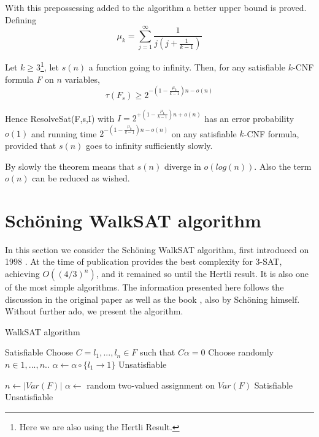 With this prepossessing added to the algorithm a better upper bound is proved. Defining
$$ \mu_k = \sum_{j=1}^\infty \frac{1}{j \left (j + \frac{1}{k-1}\right )}$$

\begin{theorem} Let $k\ge 3$\footnote{Here we are also using the Hertli Result\cite{hertli20143}.}, let $s(n)$ a function going to infinity. Then, for any satisfiable $k$-CNF formula $F$ on $n$ variables,
  $$\tau(F_s) \ge 2^{-(1-\frac{\mu_k}{k-1})n-o(n)}$$

  Hence ResolveSat(F,s,I) with $I = 2^{+(1-\frac{\mu_k}{k-1})n+o(n)}$ has an error probability $o(1)$ and running time $2^{-(1-\frac{\mu_k}{k-1})n-o(n)}$ on any satisfiable $k$-CNF formula, provided that $s(n)$ goes to infinity sufficiently slowly.
  \end{theorem}  

  By slowly the theorem means that $s(n)$ diverge in $o(log(n))$. Also the term $o(n)$ can be reduced as wished.

\section{Schöning WalkSAT algorithm}

  In this section we consider the Schöning WalkSAT algorithm, first introduced on 1998 \cite{schoning1999probabilistic}. At the time of publication provides the best complexity for 3-SAT, achieving $O((4/3)^{n})$, and it remained so until the Hertli result. It is also one of the most simple algorithms. The information presented here follows the discussion in the original paper \cite{schoning1999probabilistic} as well as the book \cite{schoning2013satisfiability}, also by Schöning himself.  Without further ado, we present the algorithm.\\
  

  \begin{algorithm}
    \caption{WalkSAT algorithm}\label{alg:ws}
    \begin{algorithmic}[1]
       \Return Satisfiable
      \EndIf
      \State Choose $C={l_1,...,l_n}\in F$ such that $C\alpha =0$
      \State Choose randomly $n\in 1,...,n$..
      \State  $\alpha \gets \alpha\circ\{l_1 \to 1\}$
      \EndFor
      \State \Return Unsatisfiable 
      \EndProcedure
      
      \State $n \gets |Var(F)|$
      \State $\alpha \gets $ random two-valued assignment on $Var(F)$
       \Return Satisfiable 
      \EndIf
      \EndFor
      \State \Return Unsatisfiable
      \EndProcedure
    \end{algorithmic}
  \end{algorithm}


